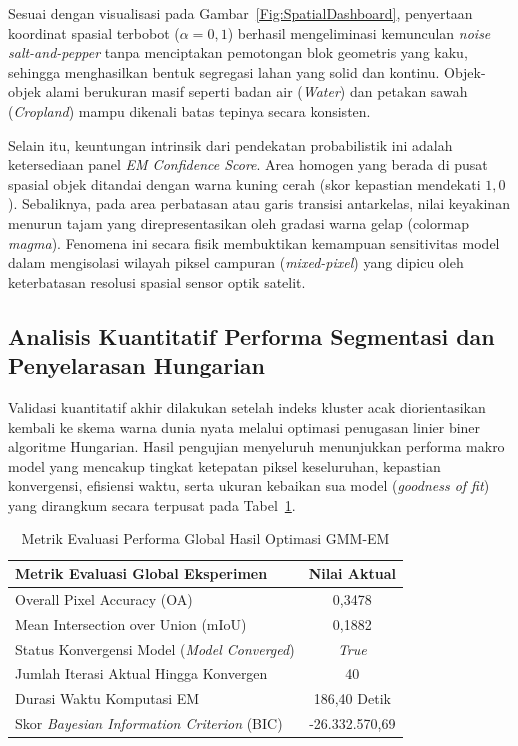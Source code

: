 \documentclass[11pt,twoside]{article}
\begin{document}
Sesuai dengan visualisasi pada Gambar~\ref{Fig:SpatialDashboard}, penyertaan koordinat spasial terbobot ($\alpha = 0,1$) berhasil mengeliminasi kemunculan \textit{noise salt-and-pepper} tanpa menciptakan pemotongan blok geometris yang kaku, sehingga menghasilkan bentuk segregasi lahan yang solid dan kontinu. Objek-objek alami berukuran masif seperti badan air (\textit{Water}) dan petakan sawah (\textit{Cropland}) mampu dikenali batas tepinya secara konsisten. 

Selain itu, keuntungan intrinsik dari pendekatan probabilistik ini adalah ketersediaan panel \textit{EM Confidence Score}. Area homogen yang berada di pusat spasial objek ditandai dengan warna kuning cerah (skor kepastian mendekati $1,0$). Sebaliknya, pada area perbatasan atau garis transisi antarkelas, nilai keyakinan menurun tajam yang direpresentasikan oleh gradasi warna gelap (colormap \textit{magma}). Fenomena ini secara fisik membuktikan kemampuan sensitivitas model dalam mengisolasi wilayah piksel campuran (\textit{mixed-pixel}) yang dipicu oleh keterbatasan resolusi spasial sensor optik satelit.

\subsection{Analisis Kuantitatif Performa Segmentasi dan Penyelarasan Hungarian}
\label{SubSec:Quantitative}
Validasi kuantitatif akhir dilakukan setelah indeks kluster acak diorientasikan kembali ke skema warna dunia nyata melalui optimasi penugasan linier biner algoritme Hungarian. Hasil pengujian menyeluruh menunjukkan performa makro model yang mencakup tingkat ketepatan piksel keseluruhan, kepastian konvergensi, efisiensi waktu, serta ukuran kebaikan sua model (\textit{goodness of fit}) yang dirangkum secara terpusat pada Tabel~\ref{Tab:GlobalMetrics}.

\begin{table}[htbp]
\centering
\caption{Metrik Evaluasi Performa Global Hasil Optimasi GMM-EM}
\label{Tab:GlobalMetrics}
\begin{tabular}{lc}
\hline
\textbf{Metrik Evaluasi Global Eksperimen} & \textbf{Nilai Aktual} \\
\hline
Overall Pixel Accuracy (OA) & 0,3478 \\
Mean Intersection over Union (mIoU) & 0,1882 \\
Status Konvergensi Model (\textit{Model Converged}) & \textit{True} \\
Jumlah Iterasi Aktual Hingga Konvergen & 40 \\
Durasi Waktu Komputasi EM & 186,40 Detik \\
Skor \textit{Bayesian Information Criterion} (BIC) & -26.332.570,69 \\
\hline
\end{tabular}
\end{table}
\end{document}
